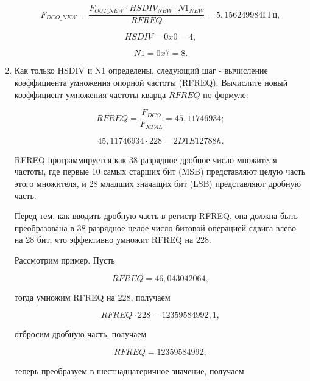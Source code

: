 \begin{enumerate}
	\begin{equation}	
		F_{DCO\_NEW} =  \frac{F_{OUT\_NEW} \cdot HSDIV_{NEW} \cdot N1_{NEW}}{RFREQ} = 5,156249984 ГГц,
	\end{equation}

	\begin{equation}	
		HSDIV = 0x0 = 4,
	\end{equation}
	
	\begin{equation}	
		N1 = 0x7 = 8.
	\end{equation}
	
	\item Как только HSDIV и N1 определены, следующий шаг - вычисление коэффициента умножения опорной частоты (RFREQ). Вычислите новый коэффициент умножения частоты кварца \(RFREQ\) по формуле:

	\begin{equation}	
		RFREQ = \frac{F_{DCO}}{F_{XTAL}} = 45,11746934;
	\end{equation}

	\begin{equation}	
		45,11746934 \cdot 228 = 2D1E12788h.
	\end{equation}

	RFREQ программируется как 38-разрядное дробное число множителя частоты, где первые 10 самых старших бит (MSB) представляют целую часть этого множителя, и 28 младших значащих бит (LSB) представляют дробную часть.

	Перед тем, как вводить дробную часть в регистр RFREQ, она должна быть преобразована в 38-разрядное целое число битовой операцией сдвига влево на 28 бит, что эффективно умножит RFREQ на 228.

	Рассмотрим пример. Пусть 
	
	\begin{equation}	
		RFREQ =  46,043042064,
	\end{equation}

	тогда умножим RFREQ на 228, получаем

	\begin{equation}	
		RFREQ \cdot 228 =  12359584992,1,
	\end{equation}

	отбросим дробную часть, получаем 

	\begin{equation}	
		RFREQ =  12359584992,
	\end{equation}

	теперь преобразуем в шестнадцатеричное значение, получаем


\end{enumerate}
